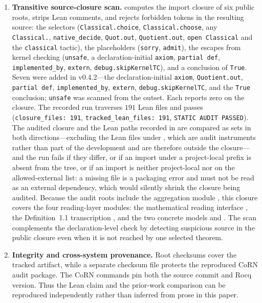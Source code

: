\documentclass[11pt]{article}
\theoremstyle{definition}
\theoremstyle{remark}
\begin{document}
\begin{enumerate}[label=(\arabic*)]
\item \textbf{Transitive source-closure scan.}   computes the import closure of six public roots, strips Lean comments, and rejects forbidden tokens in the resulting source: the selectors (\texttt{Classical.choice}, \texttt{Classical.choose}, any \texttt{Classical.}, \texttt{native\_decide}, \texttt{Quot.out}, \texttt{Quotient.out}, \texttt{open Classical} and the \texttt{classical} tactic), the placeholders (\texttt{sorry}, \texttt{admit}), the escapes from kernel checking (\texttt{unsafe}, a declaration-initial \texttt{axiom}, \texttt{partial def}, \texttt{implemented\_by}, \texttt{extern}, \texttt{debug.skipKernelTC}), and a conclusion of \texttt{True}.  Seven were added in v0.4.2---the declaration-initial \texttt{axiom}, \texttt{Quotient.out}, \texttt{partial def}, \texttt{implemented\_by}, \texttt{extern}, \texttt{debug.skipKernelTC}, and the \texttt{True} conclusion; \texttt{unsafe} was scanned from the outset.  Each reports zero on the closure.  The recorded run traverses $191$ Lean files and passes (\texttt{closure\_files: 191}, \texttt{tracked\_lean\_files: 191}, \texttt{STATIC AUDIT PASSED}).  The audited closure and the Lean paths recorded in  are compared as sets in both directions---excluding the Lean files under , which are audit instruments rather than part of the development and are therefore outside the closure---and the run fails if they differ, or if an import under a project-local prefix is absent from the tree, or if an import is neither project-local nor on the allowed-external list: a missing file is a packaging error and must not be read as an external dependency, which would silently shrink the closure being audited.  Because the audit roots include the aggregation module , this closure covers the four reading-layer modules: the mathematical reading interface , the Definition~1.1 transcription , and the two concrete models  and .  The scan complements the declaration-level check by detecting suspicious source in the public closure even when it is not reached by one selected theorem.

\item \textbf{Integrity and cross-system provenance.}  Root checksums cover the tracked artifact, while a separate checksum file protects the reproduced CoRN audit package.  The CoRN commands pin both the source commit and Rocq version.  Thus the Lean claim and the prior-work comparison can be reproduced independently rather than inferred from prose in this paper.
\end{enumerate}
\end{document}
